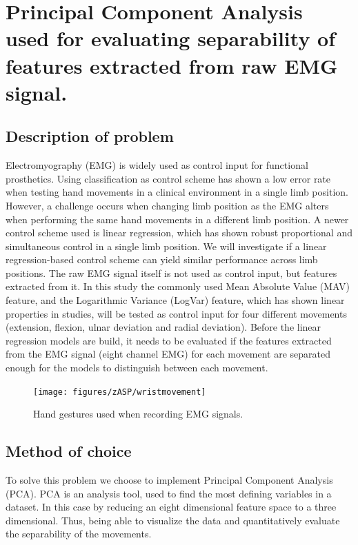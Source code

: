

\chapter*{Principal Component Analysis used for evaluating separability of features extracted from raw EMG signal.}

\section*{Description of problem}
Electromyography (EMG) is widely used as control input for functional prosthetics. Using classification as control scheme has shown a low error rate when testing hand movements in a clinical environment in a single limb position. However, a challenge occurs when changing limb position as the EMG alters when performing the same hand movements in a different limb position. A newer control scheme used is linear regression, which has shown robust proportional and simultaneous control in a single limb position. We will investigate if a linear regression-based control scheme can yield similar performance across limb positions. 
The raw EMG signal itself is not used as control input, but features extracted from it. In this study the commonly used Mean Absolute Value (MAV) feature, and the Logarithmic Variance (LogVar) feature, which has shown linear properties in studies, will be tested as control input for four different movements (extension, flexion, ulnar deviation and radial deviation). Before the linear regression models are build, it needs to be evaluated if the features extracted from the EMG signal (eight channel EMG) for each movement are separated enough for the models to distinguish between each movement. 

\begin{figure}[H] 
	\texttt{[image: figures/zASP/wristmovement]}
	\caption{Hand gestures used when recording EMG signals.}
	\label{projection}
\end{figure}

\section*{Method of choice}
To solve this problem we choose to implement Principal Component Analysis (PCA). PCA is an analysis tool, used to find the most defining variables in a dataset. In this case by reducing an eight dimensional feature space to a three dimensional. Thus, being able to visualize the data and quantitatively evaluate the separability of the movements.

